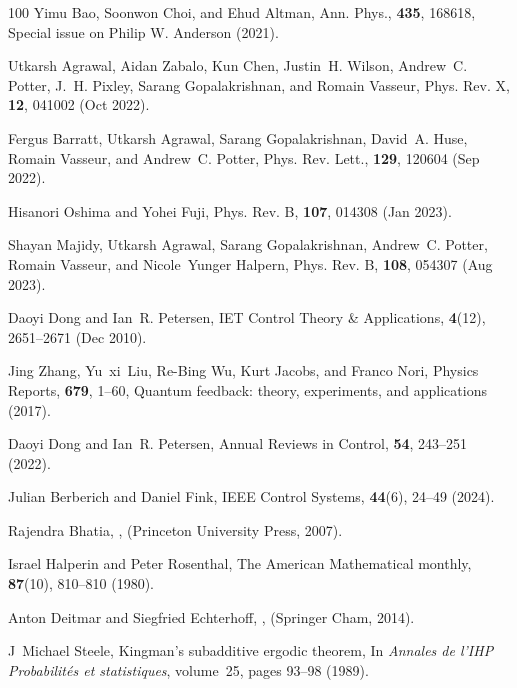 \documentclass[preprint,pteplogo]{ptephy_v2}%
\numberwithin{equation}{section}
\theoremstyle{definition}
\begin{document}
\begin{thebibliography}{100}
Yimu Bao, Soonwon Choi, and Ehud Altman, Ann. Phys., {\bf 435}, 168618, Special issue on Philip W. Anderson (2021).

Utkarsh Agrawal, Aidan Zabalo, Kun Chen, Justin~H. Wilson, Andrew~C. Potter, J.~H. Pixley, Sarang Gopalakrishnan, and Romain Vasseur, Phys. Rev. X, {\bf 12}, 041002 (Oct 2022).

Fergus Barratt, Utkarsh Agrawal, Sarang Gopalakrishnan, David~A. Huse, Romain Vasseur, and Andrew~C. Potter, Phys. Rev. Lett., {\bf 129}, 120604 (Sep 2022).

Hisanori Oshima and Yohei Fuji, Phys. Rev. B, {\bf 107}, 014308 (Jan 2023).

Shayan Majidy, Utkarsh Agrawal, Sarang Gopalakrishnan, Andrew~C. Potter, Romain Vasseur, and Nicole~Yunger Halpern, Phys. Rev. B, {\bf 108}, 054307 (Aug 2023).

Daoyi Dong and Ian~R. Petersen, IET Control Theory {\&} Applications, {\bf 4}(12), 2651--2671 (Dec 2010).

Jing Zhang, Yu~xi~Liu, Re-Bing Wu, Kurt Jacobs, and Franco Nori, Physics Reports, {\bf 679}, 1--60, Quantum feedback: theory, experiments, and applications (2017).

Daoyi Dong and Ian~R. Petersen, Annual Reviews in Control, {\bf 54}, 243--251 (2022).

Julian Berberich and Daniel Fink, IEEE Control Systems, {\bf 44}(6), 24--49 (2024).

Rajendra Bhatia,
,
\newblock  (Princeton University Press, 2007).

Israel Halperin and Peter Rosenthal, The American Mathematical monthly, {\bf 87}(10), 810--810 (1980).

Anton Deitmar and Siegfried Echterhoff,
,
\newblock  (Springer Cham, 2014).

J~Michael Steele,
\newblock Kingman's subadditive ergodic theorem,
\newblock In {\em Annales de l'IHP Probabilit{\'e}s et statistiques}, volume~25, pages 93--98 (1989).

\end{thebibliography}

%

\vspace{0.2cm}
\noindent

\end{document}
